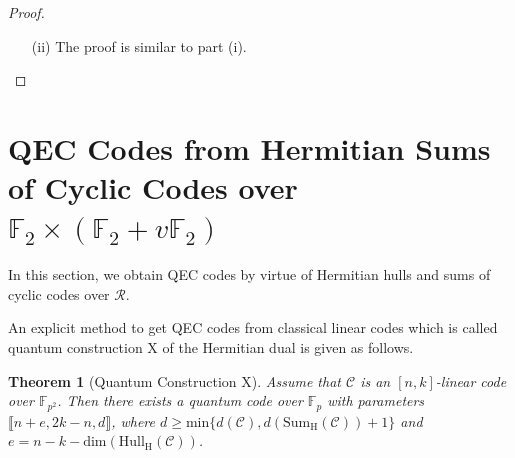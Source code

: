 \documentclass[pdflatex,sn-mathphys-num]{sn-jnl}%
\theoremstyle{thmstyleone}%
\newtheorem{theorem}{Theorem}%
\theoremstyle{thmstyletwo}%
\theoremstyle{thmstylethree}%
\begin{document}
\begin{proof}
\begin{itemize}
Thus, $c_{i}(x)\mid e_{i}(x)$ and therefore there exists $p_{i}(x)\in
\mathbb{F}_{2}[x]$ such that $e_{i}(x)=c_{i}(x)p_{i}(x)$ for $i\in \{1,2,3\}$. Then
\begin{equation*}
(e_{1}(x),(1+v)e_{2}(x)+ve_{3}(x))=(p_{1}(x),(1+v)p_{2}(x)+vp_{3}(x))(c_{1}(x),(1+v)c_{2}(x)+vc_{3}(x)).
\end{equation*}
This means $\mathrm{Hull_{H}}(\mathcal{C})\subseteq \mathcal{A}$. Hence,
\begin{equation*}
\mathrm{Hull_{H}}(\mathcal{C})=\langle (\mathrm{lcm}(r_{1}(x),\Bar{h}_{1}(x)),(1+v) \mathrm{lcm}(r_{2}(x),\Bar{h}_{3}(x))+v\mathrm{\mathrm{lcm}}(r_{3}(x),\Bar{h}_{2}(x)))\rangle .
\end{equation*}
By Theorem \ref{7.1} part (i), we get
\begin{equation*}
|\mathrm{Hull_{H}}(\mathcal{C})|=2^{3n-\mathrm{\deg }(\mathrm{lcm}(r_{1}(x),\Bar{h}_{1}(x)))-\mathrm{\deg }(\mathrm{lcm}(r_{2}(x),\Bar{h}_{3}(x)))-\mathrm{\deg }(\mathrm{lcm}(r_{3}(x),\Bar{h}_{2}(x)))}.
\end{equation*}

\item[(ii)] The proof is similar to part (i).
\end{itemize}
\end{proof}

\section{QEC Codes from Hermitian Sums of Cyclic Codes over $\mathbb{F}_2\times(\mathbb{F}_2+v\mathbb{F}_2)$}
\label{sec4}
In this section, we obtain QEC codes by virtue of Hermitian hulls and sums of cyclic codes over $\mathcal{R}$.

\noindent An explicit method to get QEC codes from classical linear codes which is called quantum construction X of the Hermitian dual is given as follows.

\begin{theorem}[Quantum Construction X]
\cite{quantumxhermitian}\label{quantumxhermitian} Assume that $\mathcal{C}$ is an $[n,k]$-linear code over $\mathbb{F}_{p^2}$. Then there exists a quantum code over $\mathbb{F}_p$
with parameters $\llbracket n+e,2k-n,d\rrbracket $, where $d \geq \mathrm{min} \{d(\mathcal{C}%
),d(\mathrm{Sum_H}(\mathcal{C}))+1\}$ and $e = n-k-\mathrm{dim}(\mathrm{Hull_H}(\mathcal{C}))$.
\end{theorem}
\end{document}

